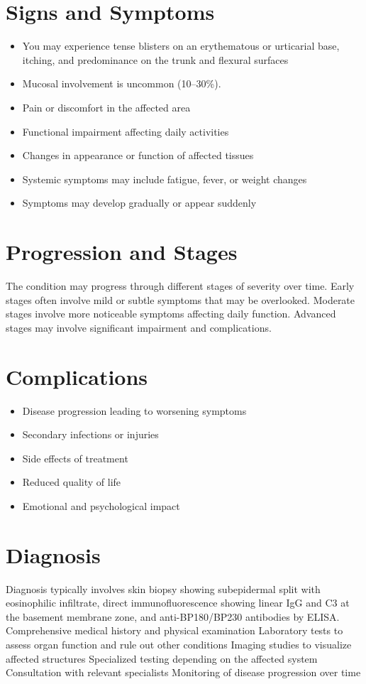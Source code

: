 \section{Signs and Symptoms}
\begin{itemize}[noitemsep]
  \item You may experience tense blisters on an erythematous or urticarial base, itching, and predominance on the trunk and flexural surfaces
  \item Mucosal involvement is uncommon (10--30\%).
  \item Pain or discomfort in the affected area
  \item Functional impairment affecting daily activities
  \item Changes in appearance or function of affected tissues
  \item Systemic symptoms may include fatigue, fever, or weight changes
  \item Symptoms may develop gradually or appear suddenly
\end{itemize}
\section{Progression and Stages}
The condition may progress through different stages of severity over time. Early stages often involve mild or subtle symptoms that may be overlooked. Moderate stages involve more noticeable symptoms affecting daily function. Advanced stages may involve significant impairment and complications.
\section{Complications}
\begin{itemize}[noitemsep]
  \item Disease progression leading to worsening symptoms
  \item Secondary infections or injuries
  \item Side effects of treatment
  \item Reduced quality of life
  \item Emotional and psychological impact
\end{itemize}
\section{Diagnosis}
Diagnosis typically involves skin biopsy showing subepidermal split with eosinophilic infiltrate, direct immunofluorescence showing linear IgG and C3 at the basement membrane zone, and anti-BP180/BP230 antibodies by ELISA. Comprehensive medical history and physical examination Laboratory tests to assess organ function and rule out other conditions Imaging studies to visualize affected structures Specialized testing depending on the affected system Consultation with relevant specialists Monitoring of disease progression over time


